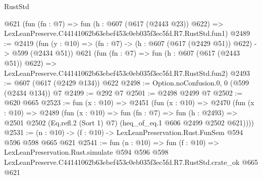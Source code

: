\begin{lexlean}{RustStd}
\begin{coremodule}
    @621
    (fun (fn : @7) =>
    fun (h : @607 (@617 (@2443 @23)) @622) =>
    LexLeanPreserve.C44141062b63ebef453c0eb035f3ec5fd.R7.RustStd.fun1)
@2489 := @2419
    (fun (y : @10) => (fn : @7) -> (h : @607 (@617 (@2429 @51)) @622) -> @599 (@2434 @51))
    @621
    (fun (fn : @7) =>
    fun (h : @607 (@617 (@2443 @51)) @622) =>
    LexLeanPreserve.C44141062b63ebef453c0eb035f3ec5fd.R7.RustStd.fun2)
@2493 := @607 (@617 (@2429 @134)) @622
@2498 := Option.noConfusion.{0, 0} (@599 (@2434 @134)) @7
@2499 := @292 @7
@2501 := @2498 @2499 @7
@2502 := @620 @665
@2523 := fun (x : @10) =>
  @2451
    (fun (x : @10) =>
    @2470
      (fun (x : @10) =>
      @2489
        (fun (x : @10) =>
        fun (fn : @7) =>
        fun (h : @2493) =>
        @2501 @2502 (Eq.refl.{2} (Sort 1) @7) (heq_of_eq.{1} @606 @2499 @2502 @621))))
@2531 := (n : @10) -> (f : @10) -> LexLeanPreservation.Rust.FunSem @594 @596 @598 @665 @621
@2541 := fun (n : @10) =>
  fun (f : @10) =>
  LexLeanPreservation.Rust.simulate
    @594
    @596
    @598
    LexLeanPreserve.C44141062b63ebef453c0eb035f3ec5fd.R7.RustStd.crate_ok
    @665
    @621
\end{coremodule}
\end{lexlean}

